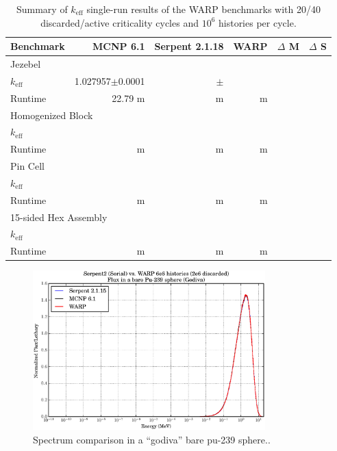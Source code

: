 \begin{table}[h]
\centering
\caption{Summary of $k_\mathrm{eff}$ single-run results of the WARP benchmarks with 20/40 discarded/active criticality cycles and $10^6$ histories per cycle.}
\label{benchmark_summary}
\begin{tabular}{| l | r | r | r | r | r |}
 \hline
 Benchmark & MCNP 6.1 & Serpent 2.1.18 & WARP & $\Delta$ M & $\Delta$ S  \\
\hline
\hline
\multicolumn{6}{|l|}{Jezebel}  \\
\hline
 $k_\mathrm{eff}$ & 1.027957$\pm$0.0001 & $\pm$ &  &  &   \\
 \hline
 Runtime               & 22.79 m &  m &  m &   &   \\
 \hline
 \hline
\multicolumn{6}{|l|}{Homogenized Block }\\
\hline
 $k_\mathrm{eff}$ & &  &  & &    \\
 \hline
 Runtime               & m &  m &  m & &  \\
 \hline
  \hline
\multicolumn{6}{|l|}{Pin Cell}\\
\hline
 $k_\mathrm{eff}$ & &  &  & &    \\
 \hline
 Runtime               & m &  m &  m & &  \\
 \hline
  \hline
\multicolumn{6}{|l|}{15-sided Hex Assembly}\\
\hline
 $k_\mathrm{eff}$ & &  &  & &    \\
 \hline
 Runtime               & m &  m &  m & &  \\
 \hline
\end{tabular}
\end{table}

\begin{figure}[h!] 
\centering
\includegraphics[width=0.8\textwidth]{graphics/finalresults/godiva_spec.eps}
\caption{Spectrum comparison in a ``godiva'' bare pu-239 sphere.. \label{godiva_spec} }
\end{figure}

